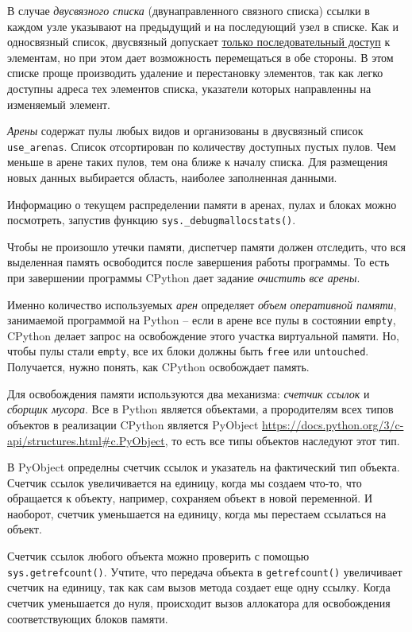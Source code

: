 \documentclass[%
	11pt,
	a4paper,
	utf8,
		]{article}
\begin{document}
В случае \emph{двусвязного списка} (двунаправленного связного списка) ссылки в каждом узле указывают на предыдущий и на последующий узел в списке. Как и односвязный список, двусвязный допускает \underline{только последовательный доступ} к элементам, но при этом дает возможность перемещаться в обе стороны. В этом списке проще производить удаление и перестановку элементов, так как легко доступны адреса тех элементов списка, указатели которых направленны на изменяемый элемент.

\emph{Арены} содержат пулы любых видов и организованы в двусвязный список \texttt{use\_arenas}. Список отсортирован по количеству доступных пустых пулов. Чем меньше в арене таких пулов, тем она ближе к началу списка. Для размещения новых данных выбирается область, наиболее заполненная данными.

Информацию о текущем распределении памяти в аренах, пулах и блоках можно посмотреть, запустив функцию \texttt{sys.\_debugmallocstats()}.

Чтобы не произошло утечки памяти, диспетчер памяти должен отследить, что вся выделенная память освободится после завершения работы программы. То есть при завершении программы CPython дает задание \emph{очистить все арены}.

{\color{blue}
Именно количество используемых \emph{арен} определяет \emph{объем оперативной памяти}, занимаемой программой на Python -- если в арене все пулы в состоянии \texttt{empty}, CPython делает запрос на освобождение этого участка виртуальной памяти. Но, чтобы пулы стали \texttt{empty}, все их блоки должны быть \texttt{free} или \texttt{untouched}. Получается, нужно понять, как CPython освобождает память.
}

Для освобождения памяти используются два механизма: \emph{счетчик ссылок} и \emph{сборщик мусора}. Все в Python является объектами, а прородителям всех типов объектов в реализации CPython является PyObject \url{https://docs.python.org/3/c-api/structures.html#c.PyObject}, то есть все типы объектов наследуют этот тип.

В PyObject определны счетчик ссылок и указатель на фактический тип объекта. Счетчик ссылок увеличивается на единицу, когда мы создаем что-то, что обращается к объекту, например, сохраняем объект в новой переменной. И наоборот, счетчик уменьшается на единицу, когда мы перестаем ссылаться на объект.

Счетчик ссылок любого объекта можно проверить с помощью \texttt{sys.getrefcount()}. Учтите, что передача объекта в \texttt{getrefcount()} увеличивает счетчик на единицу, так как сам вызов метода создает еще одну ссылку. Когда счетчик уменьшается до нуля, происходит вызов аллокатора для освобождения соответствующих блоков памяти.
\end{document}
